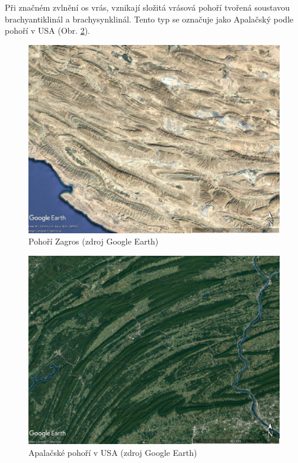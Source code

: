 Při značném zvlnění os vrás, vznikají složitá vrásová pohoří tvořená soustavou brachyantiklinál a brachysynklinál. Tento typ se označuje jako Apalačský podle pohoří v USA (Obr. \ref{fig:apalachian}).

\begin{figure}[h]
	\centering
	\includegraphics[width=1\linewidth]{obrazky/tectonic/zagros}
	\caption{Pohoří Zagros (zdroj Google Earth)}
	\label{fig:zagros}
\end{figure}

\begin{figure}[h]
	\centering
	\includegraphics[width=1\linewidth]{obrazky/tectonic/apalachian}
	\caption{Apalačské pohoří v USA (zdroj Google Earth)}
	\label{fig:apalachian}
\end{figure}


